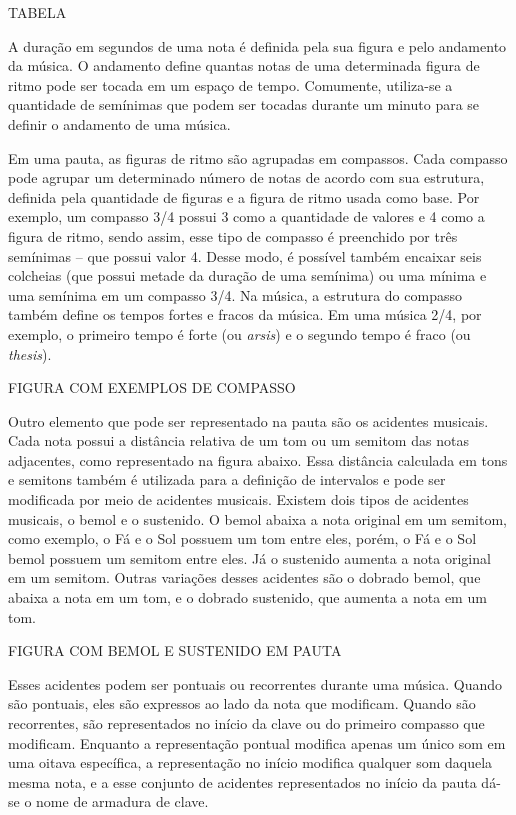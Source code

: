       TABELA

      A duração em segundos de uma nota é definida pela sua figura e pelo andamento da música. O andamento define quantas notas de uma determinada figura de ritmo pode ser tocada em um espaço de tempo. Comumente, utiliza-se a quantidade de semínimas que podem ser tocadas durante um minuto para se definir o andamento de uma música.

      Em uma pauta, as figuras de ritmo são agrupadas em compassos. Cada compasso pode agrupar um determinado número de notas de acordo com sua estrutura, definida pela quantidade de figuras e a figura de ritmo usada como base. Por exemplo, um compasso 3/4 possui 3 como a quantidade de valores e 4 como a figura de ritmo, sendo assim, esse tipo de compasso é preenchido por três semínimas -- que possui valor 4. Desse modo, é possível também encaixar seis colcheias (que possui metade da duração de uma semínima) ou uma mínima e uma semínima em um compasso 3/4. Na música, a estrutura do compasso também define os tempos fortes e fracos da música. Em uma música 2/4, por exemplo, o primeiro tempo é forte (ou \textit{arsis}) e o segundo tempo é fraco (ou \textit{thesis}).

      FIGURA COM EXEMPLOS DE COMPASSO

      Outro elemento que pode ser representado na pauta são os acidentes musicais. Cada nota possui a distância relativa de um tom ou um semitom das notas adjacentes, como representado na figura abaixo. Essa distância calculada em tons e semitons também é utilizada para a definição de intervalos e pode ser modificada por meio de acidentes musicais. Existem dois tipos de acidentes musicais, o bemol e o sustenido. O bemol abaixa a nota original em um semitom, como exemplo, o Fá e o Sol possuem um tom entre eles, porém, o Fá e o Sol bemol possuem um semitom entre eles. Já o sustenido aumenta a nota original em um semitom. Outras variações desses acidentes são o dobrado bemol, que abaixa a nota em um tom, e o dobrado sustenido, que aumenta a nota em um tom.

      FIGURA COM BEMOL E SUSTENIDO EM PAUTA

      Esses acidentes podem ser pontuais ou recorrentes durante uma música. Quando são pontuais, eles são expressos ao lado da nota que modificam. Quando são recorrentes, são representados no início da clave ou do primeiro compasso que modificam. Enquanto a representação pontual modifica apenas um único som em uma oitava específica, a representação no início modifica qualquer som daquela mesma nota, e a esse conjunto de acidentes representados no início da pauta dá-se o nome de armadura de clave.

